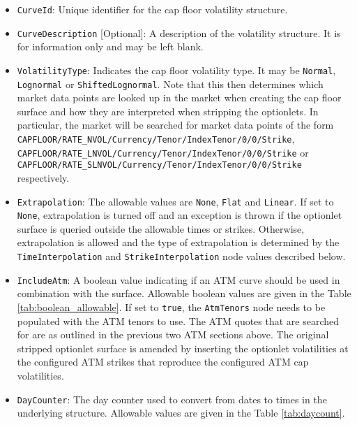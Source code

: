 \begin{itemize}
\item
\lstinline!CurveId!: Unique identifier for the cap floor volatility structure.

\item \lstinline!CurveDescription! [Optional]:
A description of the volatility structure. It is for information only and may be left blank.

\item \lstinline!VolatilityType!:
Indicates the cap floor volatility type. It may be \lstinline!Normal!, \lstinline!Lognormal! or \lstinline!ShiftedLognormal!. Note that this then determines which market data points are looked up in the market when creating the cap floor surface and how they are interpreted when stripping the optionlets. In particular, the market will be searched for market data points of the form \lstinline!CAPFLOOR/RATE_NVOL/Currency/Tenor/IndexTenor/0/0/Strike!, \lstinline!CAPFLOOR/RATE_LNVOL/Currency/Tenor/IndexTenor/0/0/Strike! or \lstinline!CAPFLOOR/RATE_SLNVOL/Currency/Tenor/IndexTenor/0/0/Strike! respectively.

\item \lstinline!Extrapolation!:
The allowable values are \lstinline!None!, \lstinline!Flat! and \lstinline!Linear!. If set to \lstinline!None!, extrapolation is turned off and an exception is thrown if the optionlet surface is queried outside the allowable times or strikes. Otherwise, extrapolation is allowed and the type of extrapolation is determined by the \lstinline!TimeInterpolation! and \lstinline!StrikeInterpolation! node values described below.

\item \lstinline!IncludeAtm!:
A boolean value indicating if an ATM curve should be used in combination with the surface. Allowable boolean values are given in the Table \ref{tab:boolean_allowable}. If set to \lstinline!true!, the \lstinline!AtmTenors! node needs to be populated with the ATM tenors to use. The ATM quotes that are searched for are as outlined in the previous two ATM sections above. The original stripped optionlet surface is amended by inserting the optionlet volatilities at the configured ATM strikes that reproduce the configured ATM cap volatilities.

\item \lstinline!DayCounter!:
The day counter used to convert from dates to times in the underlying structure. Allowable values are given in the Table \ref{tab:daycount}.


\end{itemize}
